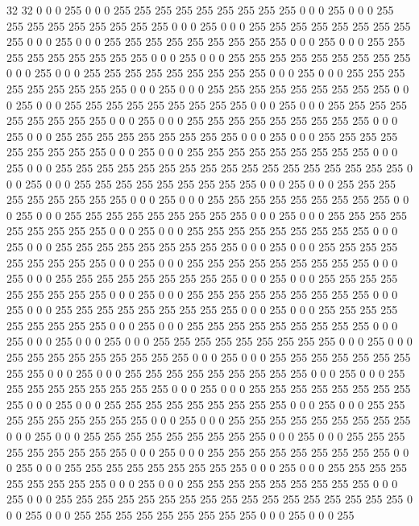 32 32 0 0 0 255 0 0 0 255 255 255 255 255 255 255 255 255 0 0 0 255 0 0 0 255 255 255 255 255 255 255 255 255
0 0 0 255 0 0 0 255 255 255 255 255 255 255 255 255 0 0 0 255 0 0 0 255 255 255 255 255 255 255 255 255
0 0 0 255 0 0 0 255 255 255 255 255 255 255 255 255 0 0 0 255 0 0 0 255 255 255 255 255 255 255 255 255
0 0 0 255 0 0 0 255 255 255 255 255 255 255 255 255 0 0 0 255 0 0 0 255 255 255 255 255 255 255 255 255
0 0 0 255 0 0 0 255 255 255 255 255 255 255 255 255 0 0 0 255 0 0 0 255 255 255 255 255 255 255 255 255
0 0 0 255 0 0 0 255 255 255 255 255 255 255 255 255 0 0 0 255 0 0 0 255 255 255 255 255 255 255 255 255
0 0 0 255 0 0 0 255 255 255 255 255 255 255 255 255 0 0 0 255 0 0 0 255 255 255 255 255 255 255 255 255
0 0 0 255 0 0 0 255 255 255 255 255 255 255 255 255 0 0 0 255 0 0 0 255 255 255 255 255 255 255 255 255
255 255 255 255 255 255 255 255 0 0 0 255 0 0 0 255 255 255 255 255 255 255 255 255 0 0 0 255 0 0 0 255
255 255 255 255 255 255 255 255 0 0 0 255 0 0 0 255 255 255 255 255 255 255 255 255 0 0 0 255 0 0 0 255
255 255 255 255 255 255 255 255 0 0 0 255 0 0 0 255 255 255 255 255 255 255 255 255 0 0 0 255 0 0 0 255
255 255 255 255 255 255 255 255 0 0 0 255 0 0 0 255 255 255 255 255 255 255 255 255 0 0 0 255 0 0 0 255
255 255 255 255 255 255 255 255 0 0 0 255 0 0 0 255 255 255 255 255 255 255 255 255 0 0 0 255 0 0 0 255
255 255 255 255 255 255 255 255 0 0 0 255 0 0 0 255 255 255 255 255 255 255 255 255 0 0 0 255 0 0 0 255
255 255 255 255 255 255 255 255 0 0 0 255 0 0 0 255 255 255 255 255 255 255 255 255 0 0 0 255 0 0 0 255
255 255 255 255 255 255 255 255 0 0 0 255 0 0 0 255 255 255 255 255 255 255 255 255 0 0 0 255 0 0 0 255
0 0 0 255 0 0 0 255 255 255 255 255 255 255 255 255 0 0 0 255 0 0 0 255 255 255 255 255 255 255 255 255
0 0 0 255 0 0 0 255 255 255 255 255 255 255 255 255 0 0 0 255 0 0 0 255 255 255 255 255 255 255 255 255
0 0 0 255 0 0 0 255 255 255 255 255 255 255 255 255 0 0 0 255 0 0 0 255 255 255 255 255 255 255 255 255
0 0 0 255 0 0 0 255 255 255 255 255 255 255 255 255 0 0 0 255 0 0 0 255 255 255 255 255 255 255 255 255
0 0 0 255 0 0 0 255 255 255 255 255 255 255 255 255 0 0 0 255 0 0 0 255 255 255 255 255 255 255 255 255
0 0 0 255 0 0 0 255 255 255 255 255 255 255 255 255 0 0 0 255 0 0 0 255 255 255 255 255 255 255 255 255
0 0 0 255 0 0 0 255 255 255 255 255 255 255 255 255 0 0 0 255 0 0 0 255 255 255 255 255 255 255 255 255
0 0 0 255 0 0 0 255 255 255 255 255 255 255 255 255 0 0 0 255 0 0 0 255 255 255 255 255 255 255 255 255
255 255 255 255 255 255 255 255 0 0 0 255 0 0 0 255 255 255 255 255 255 255 255 255 0 0 0 255 0 0 0 255
